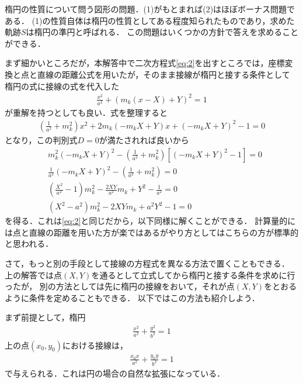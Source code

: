 \documentclass[a4paper,10pt]{ltjsarticle}
\begin{document}
\begin{multicols}{2}
楕円の性質について問う図形の問題．(1)がもとまれば(2)はほぼボーナス問題である．
(1)の性質自体は楕円の性質としてある程度知られたものであり，求めた軌跡$S$は楕円の準円と呼ばれる．
この問題はいくつかの方針で答えを求めることができる．

まず細かいところだが，本解答中で二次方程式\cref{eq:2}を出すところでは，座標変換と点と直線の距離公式を用いたが，そのまま接線が楕円と接する条件として
楕円の式に接線の式を代入した
\begin{align*}
  \frac{x^2}{a^2}+\left(m_k(x-X)+Y\right)^2 = 1
\end{align*}
が重解を持つとしても良い．式を整理すると
\begin{align*}
  \left(\frac{1}{a^2}+m_k^2\right)x^2 + 2m_k\left(-m_kX+Y\right)x +\left(-m_kX+Y\right)^2 -1 = 0
\end{align*}
となり，この判別式$D=0$が満たされれば良いから
\begin{align*}
 &m_k^2\left(-m_kX+Y\right)^2 - \left(\frac{1}{a^2}+m_k^2\right)\left[\left(-m_kX+Y\right)^2 -1\right] = 0 \\
 &\frac{1}{a^2}\left(-m_kX+Y\right)^2 -\left(\frac{1}{a^2}+m_k^2\right) = 0 \\
 &\left(\frac{X^2}{a^2}-1\right)m_k^2 - \frac{2XY}{a^2}m_k + Y^2 -\frac{1}{a^2} = 0 \\
 &\left(X^2-a^2\right)m_k^2 - 2XYm_k + a^2Y^2 - 1= 0 
\end{align*}
を得る．これは\cref{eq:2}と同じだから，以下同様に解くことができる．
計算量的には点と直線の距離を用いた方が楽ではあるがやり方としてはこちらの方が標準的と思われる．

さて，もっと別の手段として接線の方程式を異なる方法で置くこともできる．
上の解答では点$(X,Y)$を通るとして立式してから楕円と接する条件を求めに行ったが，
別の方法としては先に楕円の接線をおいて，それが点$(X,Y)$をとおるように条件を定めることもできる．
以下ではこの方法も紹介しよう．

まず前提として，楕円
\begin{align*}
  \frac{x^2}{a^2}+\frac{y^2}{b^2} = 1
\end{align*}
上の点$(x_0,y_0)$における接線は，
\begin{align*}
  \frac{x_0 x}{a^2}+\frac{y_0 y}{b^2} = 1
\end{align*}
で与えられる．これは円の場合の自然な拡張になっている．


\end{multicols}
\end{document}
